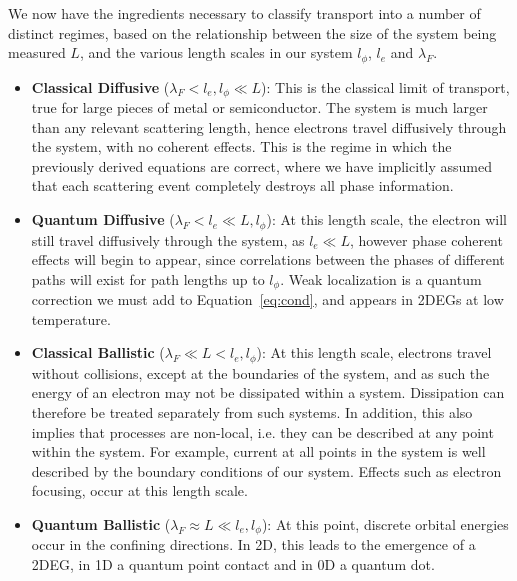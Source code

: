 We now have the ingredients necessary to classify transport into a number of distinct regimes, based on the relationship between the size
of the system being measured $L$, and the various length scales in our system $l_\phi$, $l_e$ and $\lambda_F$.
\begin{itemize}
  \item \textbf{Classical Diffusive} ($\lambda_F < l_e, l_\phi \ll L$): This is the classical limit of transport, true for large pieces of metal or semiconductor. The system is much larger than any relevant scattering length, hence electrons travel diffusively through the system, with no coherent effects. This is the regime in which the previously derived equations are correct, where we have implicitly assumed that each scattering event completely destroys all phase information.
  \item \textbf{Quantum Diffusive} ($\lambda_F < l_e \ll L, l_\phi$): At this length scale, the electron will still travel diffusively through the system, as $l_e \ll L$, however phase coherent effects will begin to appear, since correlations between the phases of different paths will exist for path lengths up to $l_\phi$. Weak localization is a quantum correction we must add to Equation~\ref{eq:cond}, and appears in 2DEGs at low temperature.
  \item \textbf{Classical Ballistic} ($\lambda_F \ll L < l_e, l_\phi$): At this length scale, electrons travel without collisions, except at the boundaries of the system, and as such the energy of an electron may not be dissipated within a system. Dissipation can therefore be treated separately from such systems. In addition, this also implies that processes are non-local, i.e. they can be described at any point within the system. For example, current at all points in the system is well described by the boundary conditions of our system. Effects such as electron focusing, occur at this length scale.
  \item \textbf{Quantum Ballistic} ($\lambda_F \approx L \ll l_e, l_\phi$): At this point, discrete orbital energies occur in the confining directions. In 2D, this leads to the emergence of a 2DEG, in 1D a quantum point contact and in 0D a quantum dot.
\end{itemize}

